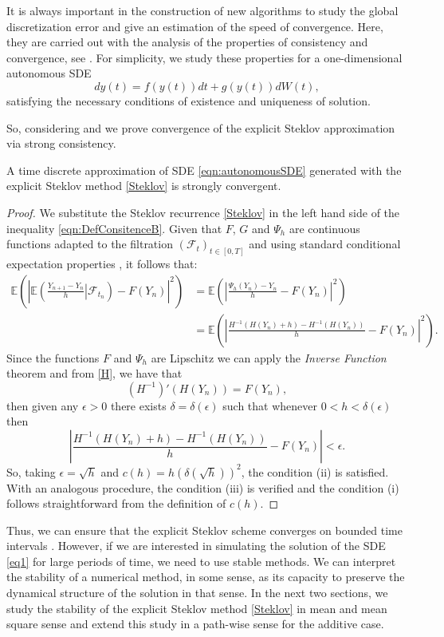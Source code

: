 
		It is always important in the construction of  new algorithms to study  the global
	discretization error and give an estimation of the speed of convergence. Here, they are
	carried out with  the analysis of the properties of consistency and convergence, see
	\cite{Kloeden1992}. For simplicity, we study these properties for a
	one-dimensional autonomous SDE
	\begin{equation}\label{eqn:autonomousSDE}
		dy(t) = f(y(t))dt+g(y(t))dW(t),
	\end{equation}
	satisfying the necessary conditions of existence and uniqueness of solution. 

	So, considering  and  we prove 
	convergence of the explicit Steklov approximation via strong consistency. 
	\begin{thm}\label{thm:Consistency}
		A time discrete approximation of SDE 
	\eqref{eqn:autonomousSDE} generated with the explicit Steklov method 
	\eqref{Steklov} is strongly convergent.
	\end{thm}
	\begin{proof}
		We substitute the Steklov recurrence \eqref{Steklov} in the left hand side of the
	inequality \eqref{eqn:DefConsitenceB}. Given that $F$, $G$ and $\Psi_h$ are continuous
	functions adapted to the filtration $(\mathcal{F}_t)_{t\in[0,T]}$ and using standard
	conditional expectation properties \cite{Williams1991}, it follows that:
	\begin{align*}
		\mathbb{E} \left(	\left| \mathbb{E} \left( \frac{Y_{n+1}-Y_n}{h}
		\left|\mathcal{F}_{t_n}\right.\right)-F \left(Y_n\right)\right|^2\right)
		&= \mathbb{E} \left(\left|\frac{\Psi_h(Y_n)-Y_n}{h}-F(Y_n)\right|^2
		\right)\\
		&= \mathbb{E} \left(\left|\frac{H^{-1}(H(Y_n)+h)-H^{-1}(H(Y_n))}{h}
		-F(Y_n)\right|^2\right).
	\end{align*}
	Since the functions $F$ and $\Psi_h$ are Lipschitz we can apply the {\it Inverse
	Function} theorem and from  \eqref{H}, we have that
	$$
		(H^{-1})'(H(Y_n))=F(Y_n),
	$$
	then given any $\epsilon>0$  there exists $\delta=\delta(\epsilon)$ such that whenever
	$0<h<\delta(\epsilon)$ then
	$$
		\left|
		\frac{H^{-1}(H(Y_n)+h)-H^{-1}(H(Y_n))}{h}
		-F(Y_n)
		\right|<\epsilon.
	$$
	So, taking $\epsilon=\sqrt{h}$ and $c(h)=h(\delta(\sqrt{h}))^2$, the  condition (ii)
	is satisfied. With an analogous procedure, the condition (iii) is verified and the
	condition (i) follows straightforward from the definition of $c(h)$.
	\end{proof}
	
		Thus,  we can ensure that the explicit Steklov scheme converges on bounded time
	intervals \cite{Robinson2002}. However, if we are interested in simulating the
	solution of the SDE \eqref{eq1} for large periods of time, we need to use stable
	methods. We can interpret the stability of a numerical method, in some sense, as its
	capacity to preserve the  dynamical structure of the solution in that sense.  In the
	next two sections, we study the stability of the explicit Steklov method
	\eqref{Steklov} in mean and mean square sense and extend this study in a path-wise
	sense for the additive case.